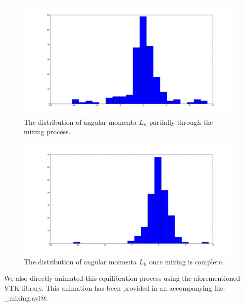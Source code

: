 \documentclass[12pt]{article}
\begin{document}
\begin{figure}[htp]
\centering
\includegraphics[width=0.5\columnwidth]{../figures/zerosum_mixing_midway_distribution.png}
\caption{The distribution of angular momenta $L_h$ partially through the mixing process.}
\label{fig:mid_dist}
\end{figure}

\begin{figure}[htp]
\centering
\includegraphics[width=0.5\columnwidth]{../figures/zerosum_mixing_final_distribution.png}
\caption{The distribution of angular momenta $L_h$ once mixing is complete.}
\label{fig:final_dist}
\end{figure}

We also directly animated this equilibration process using the aforementioned
VTK library. This animation has been provided in an accompanying file:
\verb@zerosum_mixing.avi@.



\end{document}
